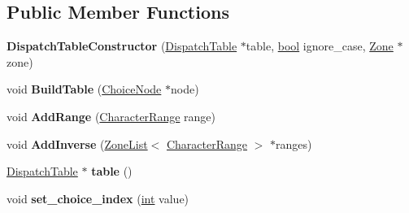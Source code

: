 \subsection*{Public Member Functions}
\begin{DoxyCompactItemize}
\item 
\mbox{\label{classv8_1_1internal_1_1DispatchTableConstructor_a6b77a705962e90834c94f3bb955c13e0}} 
{\bfseries Dispatch\+Table\+Constructor} (\mbox{\hyperlink{classv8_1_1internal_1_1DispatchTable}{Dispatch\+Table}} $\ast$table, \mbox{\hyperlink{classbool}{bool}} ignore\+\_\+case, \mbox{\hyperlink{classv8_1_1internal_1_1Zone}{Zone}} $\ast$zone)
\item 
\mbox{\label{classv8_1_1internal_1_1DispatchTableConstructor_a1b76a50e582a68e269cb890eedf6d589}} 
void {\bfseries Build\+Table} (\mbox{\hyperlink{classv8_1_1internal_1_1ChoiceNode}{Choice\+Node}} $\ast$node)
\item 
\mbox{\label{classv8_1_1internal_1_1DispatchTableConstructor_a1548155ab04ff6b6e9dd66604dedb40d}} 
void {\bfseries Add\+Range} (\mbox{\hyperlink{classv8_1_1internal_1_1CharacterRange}{Character\+Range}} range)
\item 
\mbox{\label{classv8_1_1internal_1_1DispatchTableConstructor_af12d73b2803161628f8a173f2c659b03}} 
void {\bfseries Add\+Inverse} (\mbox{\hyperlink{classv8_1_1internal_1_1ZoneList}{Zone\+List}}$<$ \mbox{\hyperlink{classv8_1_1internal_1_1CharacterRange}{Character\+Range}} $>$ $\ast$ranges)
\item 
\mbox{\label{classv8_1_1internal_1_1DispatchTableConstructor_a77523bbe347cbbbead2638b05779bf8c}} 
\mbox{\hyperlink{classv8_1_1internal_1_1DispatchTable}{Dispatch\+Table}} $\ast$ {\bfseries table} ()
\item 
\mbox{\label{classv8_1_1internal_1_1DispatchTableConstructor_af140ecca6eb06039a4a4b25f93a3379e}} 
void {\bfseries set\+\_\+choice\+\_\+index} (\mbox{\hyperlink{classint}{int}} value)
\end{DoxyCompactItemize}
